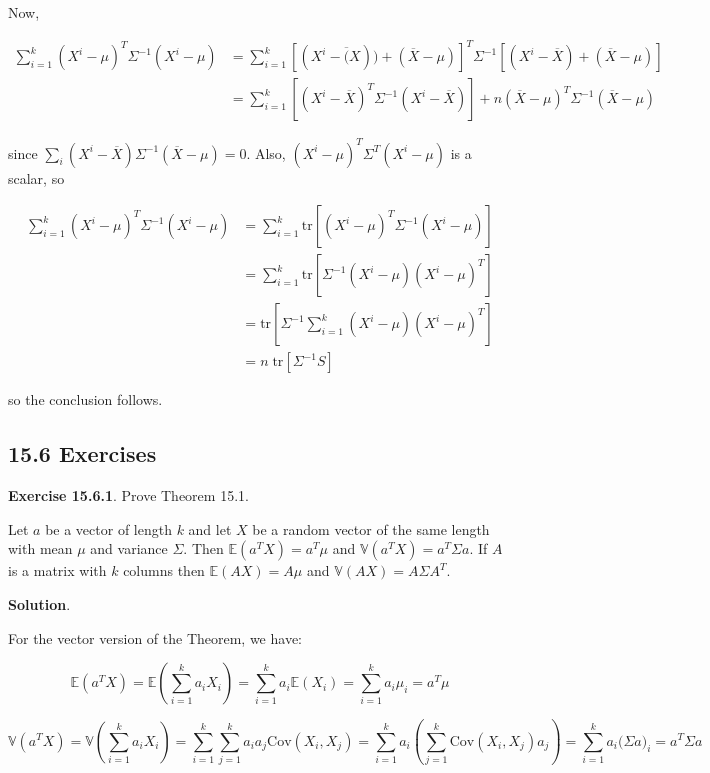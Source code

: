 Now,

\begin{align*}
\sum_{i=1}^{k} (X^{i} - \mu)^T \Sigma^{-1} (X^{i} - \mu) &=
\sum_{i=1}^{k} \left[ (X^{i} - \overline(X)) + (\overline{X} - \mu) \right]^T \Sigma^{-1} \left[(X^{i} - \overline{X}) + (\overline{X} - \mu) \right] \\
&= \sum_{i=1}^{k} [(X^{i} - \overline{X})^T\Sigma^{-1}(X^{i} - \overline{X})]
+ n (\overline{X} - \mu)^T \Sigma^{-1} (\overline{X} - \mu)
\end{align*}

since
\(\sum_{i} (X^{i} - \overline{X}) \Sigma^{-1} (\overline{X} - \mu) = 0\).
Also, \((X^{i} - \mu)^T \Sigma^T (X^{i} - \mu)\) is a scalar, so

\begin{align*}
\sum_{i=1}^{k} (X^{i} - \mu)^T \Sigma^{-1} (X^{i} - \mu) &=
\sum_{i=1}^{k} \text{tr} \left[ (X^{i} - \mu)^T \Sigma^{-1} (X^{i} - \mu)\right] \\
&= \sum_{i=1}^{k} \text{tr} \left[ \Sigma^{-1} (X^{i} - \mu) (X^{i} - \mu)^T \right] \\
&= \text{tr} \left[ \Sigma^{-1} \sum_{i=1}^{k} (X^{i} - \mu) (X^{i} - \mu) ^T \right] \\
&= n \; \text{tr} \left[ \Sigma^{-1} S\right]
\end{align*}

so the conclusion follows.

\subsection*{15.6 Exercises}

\textbf{Exercise 15.6.1}. Prove Theorem 15.1.

Let \(a\) be a vector of length \(k\) and let \(X\) be a random vector
of the same length with mean \(\mu\) and variance \(\Sigma\). Then
\(\mathbb{E}(a^T X) = a^T\mu\) and \(\mathbb{V}(a^T X) = a^T \Sigma a\).
If \(A\) is a matrix with \(k\) columns then \(\mathbb{E}(AX) = A\mu\)
and \(\mathbb{V}(AX) = A \Sigma A^T\).

\textbf{Solution}.

For the vector version of the Theorem, we have:

\[\mathbb{E}(a^T X) = \mathbb{E}\left( \sum_{i=1}^{k} a_{i} X_{i} \right) = \sum_{i=1}^{k} a_{i} \mathbb{E}(X_{i}) = \sum_{i=1}^{k} a_{i} \mu_{i} = a^T \mu \]

\[\mathbb{V}(a^T X) = \mathbb{V}\left( \sum_{i=1}^{k} a_{i} X_{i} \right) = \sum_{i=1}^{k} \sum_{j=1}^{k} a_{i} a_{j} \text{Cov} (X_{i}, X_{j}) = \sum_{i=1}^{k} a_{i} \left( \sum_{j=1}^{k} \text{Cov}(X_{i}, X_{j}) a_{j} \right) = \sum_{i=1}^{k} a_{i} \Big( \Sigma a \Big)_{i} = a^T \Sigma a\]

